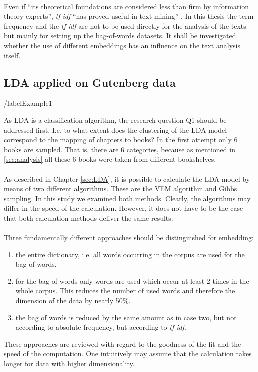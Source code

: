 \documentclass[11pt,a4paper]{article}
\begin{document}
\ \\
Even if “its theoretical foundations are considered less than firm by information theory experts”, \textit{tf-idf} “has proved useful in text mining” \cite{Silge2017}. In this thesis the term frequency and the \textit{tf-idf} are not to be used directly for the analysis of the texts but mainly for setting up the bag-of-words datasets. It shall be investigated whether the use of different embeddings has an influence on the text analysis itself.

\subsection{LDA applied on Gutenberg data} /label{Example1}

As LDA is a classification algorithm, the research question Q1 should be addressed first. I.e. to what extent does the clustering of the LDA model correspond to the mapping of chapters to books? In the first attempt only 6 books are sampled. That is, there are 6 categories, because as mentioned in \ref{sec:analysis} all these 6 books were taken from different bookshelves.\\
\ \\
As described in Chapter \ref{sec:LDA}, it is possible to calculate the LDA model by means of two different algorithms. These are the VEM algorithm and Gibbs sampling. In this study we examined both methods. Clearly, the algorithms may differ in the speed of the calculation. However, it does not have to be the case that both calculation methods deliver the same results.\\
\ \\
Three fundamentally different approaches should be distinguished for embedding:
\begin{enumerate}
	\item the entire dictionary, i.e. all words occurring in the corpus are used for the bag of words.	
	\item for the bag of words only words are used which occur at least 2 times in the whole corpus. This reduces the number of used words and therefore the dimension of the data by nearly 50\%.
	\item the bag of words is reduced by the same amount as in case two, but not according to absolute frequency, but according to \textit{tf-idf}.
\end{enumerate}
These approaches are reviewed with regard to the goodness of the fit and the speed of the computation. One intuitively may assume that the calculation takes longer for data with higher dimensionality.\\
\end{document}
